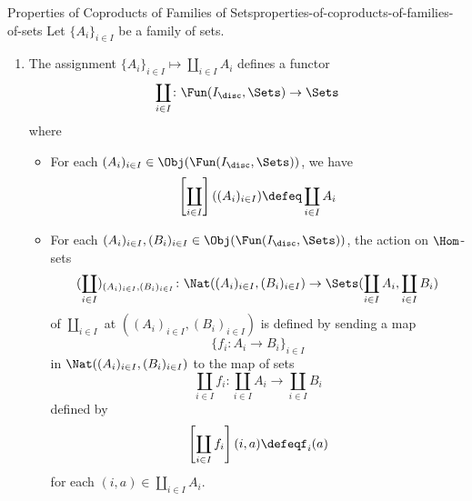 \begin{proposition}{Properties of Coproducts of Families of Sets}{properties-of-coproducts-of-families-of-sets}%
    Let $\{A_{i}\}_{i\in I}$ be a family of sets.%
    \begin{enumerate}
        \item\label{properties-of-coproducts-of-families-of-sets-functoriality}The assignment $\{A_{i}\}_{i\in I}\mapsto\coprod_{i\in I}A_{i}$ defines a functor
            \[
                \coprod_{i\in I}%
                \colon%
                \Fun(I_{\disc},\Sets)%
                \to%
                \Sets%
            \]%
            where
            \begin{itemize}
                \item{}For each $(A_{i})_{i\in I}\in\Obj(\Fun(I_{\disc},\Sets))$, we have
                    \[
                        \left[\coprod_{i\in I}\right]((A_{i})_{i\in I})%
                        \defeq%
                        \coprod_{i\in I}A_{i}%
                    \]%
                \item{}For each $(A_{i})_{i\in I},(B_{i})_{i\in I}\in\Obj(\Fun(I_{\disc},\Sets))$, the action on $\Hom$-sets
                    \[
                        (\coprod_{i\in I})_{(A_{i})_{i\in I},(B_{i})_{i\in I}}
                        \colon
                        \Nat((A_{i})_{i\in I},(B_{i})_{i\in I})%
                        \to%
                        \Sets(\coprod_{i\in I}A_{i},\coprod_{i\in I}B_{i})%
                    \]%
                    of $\coprod_{i\in I}$ at $((A_{i})_{i\in I},(B_{i})_{i\in I})$ is defined by sending a map
                    \[
                        \{%
                            f_{i}%
                            \colon%
                            A_{i}%
                            \to%
                            B_{i}
                        \}_{i\in I}%
                    \]%
                    in $\Nat((A_{i})_{i\in I},(B_{i})_{i\in I})$ to the map of sets
                    \[
                        \coprod_{i\in I}f_{i}%
                        \colon
                        \coprod_{i\in I}A_{i}%
                        \to%
                        \coprod_{i\in I}B_{i}%
                    \]%
                    defined by
                    \[
                        \left[\coprod_{i\in I}f_{i}\right](i,a)
                        \defeq%
                        f_{i}(a)
                    \]%
                    for each $(i,a)\in\coprod_{i\in I}A_{i}$.
            \end{itemize}
    \end{enumerate}
\end{proposition}
